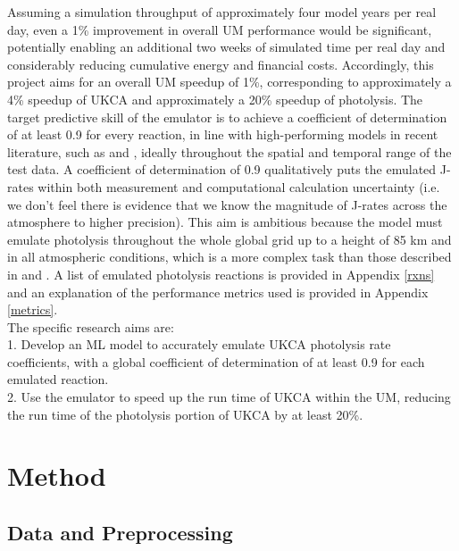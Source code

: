 \documentclass[journal abbreviation, manuscript]{copernicus}
\begin{document}
Assuming a simulation throughput of approximately four model years per real day, even a 1\% improvement in overall UM performance would be significant, potentially enabling an additional two weeks of simulated time per real day and considerably reducing cumulative energy and financial costs. Accordingly, this project aims for an overall UM speedup of 1\%, corresponding to approximately a 4\% speedup of UKCA and approximately a 20\% speedup of photolysis. The target predictive skill of the emulator is to achieve a coefficient of determination of at least 0.9 for every reaction, in line with high-performing models in recent literature, such as \cite{liu_deep_2025} and \cite{pan_development_2025}, ideally throughout the spatial and temporal range of the test data. A coefficient of determination of 0.9 qualitatively puts the emulated J-rates within both measurement and computational calculation uncertainty (i.e. we don't feel there is evidence that we know the magnitude of J-rates across the atmosphere to higher precision). This aim is ambitious because the model must emulate photolysis throughout the whole global grid up to a height of 85 km and in all atmospheric conditions, which is a more complex task than those described in \cite{liu_deep_2025} and \cite{pan_development_2025}. 
A list of emulated photolysis reactions is provided in Appendix \ref{rxns} and an explanation of the performance metrics used is provided in Appendix \ref{metrics}.\\

The specific research aims are:\\

1. Develop an ML model to accurately emulate UKCA photolysis rate coefficients, with a global coefficient of determination of at least 0.9 for each emulated reaction.\\

2. Use the emulator to speed up the run time of UKCA within the UM, reducing the run time of the photolysis portion of UKCA by at least 20\%.


\section{Method}

\subsection{Data and Preprocessing}
\end{document}
